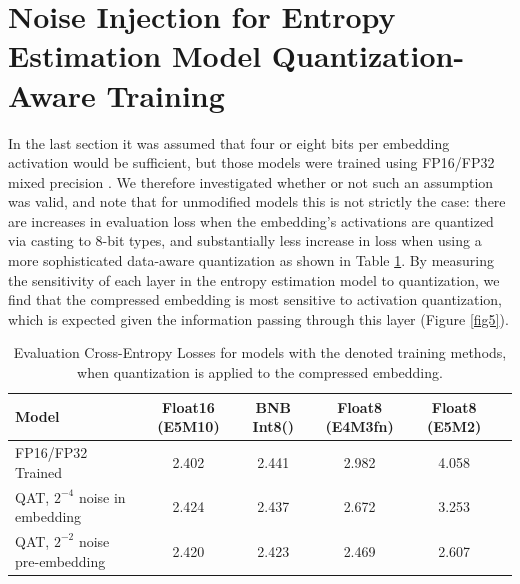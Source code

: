 \documentclass{article}
\begin{document}
\section{Noise Injection for Entropy Estimation Model Quantization-Aware Training}

    In the last section it was assumed that four or eight bits per embedding activation would be sufficient, but those models were trained using FP16/FP32 mixed precision \citep{micikevicius2018mixedprecisiontraining}. We therefore investigated whether or not such an assumption was valid, and note that for unmodified models this is not strictly the case: there are increases in evaluation loss when the embedding's activations are quantized via casting to 8-bit types, and substantially less increase in loss when using a more sophisticated data-aware quantization \citep{dettmers2022llmint88bitmatrixmultiplication} as shown in Table \ref{table2}. By measuring the sensitivity of each layer in the entropy estimation model to quantization, we find that the compressed embedding is most sensitive to activation quantization, which is expected given the information passing through this layer (Figure \ref{fig5}).

    \begin{center}
    \begin{table}[H]
    \begin{center}
    \renewcommand{\arraystretch}{1.2}
    \begin{tabular}{||l c c c c c||} 
     \hline
      Model & Float16 (E5M10) & BNB Int8() & Float8 (E4M3fn) & Float8 (E5M2) &\\ 
     \hline
      FP16/FP32 Trained & 2.402 & 2.441 & 2.982 & 4.058 & \\
     \hline
      QAT, $2^{-4}$ noise in embedding & 2.424 & 2.437 & 2.672 & 3.253 &\\ 
     \hline
      QAT, $2^{-2}$ noise pre-embedding & 2.420 & 2.423 & 2.469 & 2.607 &\\
     \hline 
    \end{tabular}
    \end{center}
    \vspace{0.1cm}
    \caption{Evaluation Cross-Entropy Losses for models with the denoted training methods, when quantization is applied to the compressed embedding.}
    \label{table2}
    \end{table}
    \end{center}
\end{document}
